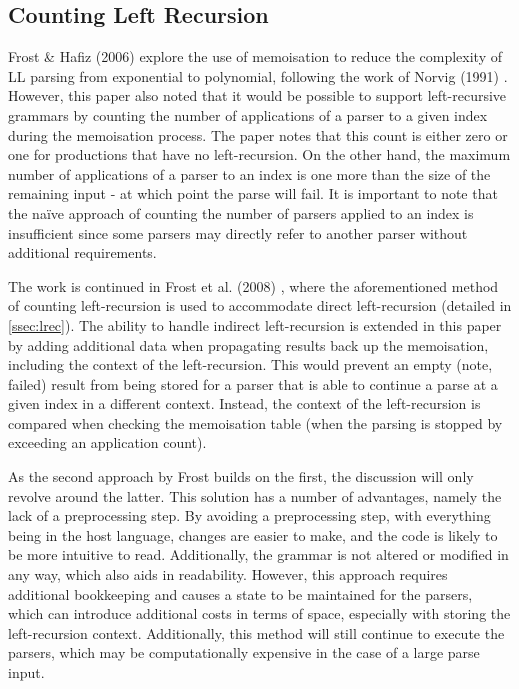 \subsection{Counting Left Recursion}
\label{ssec:lrcounts}

Frost \& Hafiz (2006) \cite{frost06} explore the use of memoisation to reduce the complexity of LL parsing from exponential to polynomial, following the work of Norvig (1991) \cite{norvig91}.
However, this paper also noted that it would be possible to support left-recursive grammars by counting the number of applications of a parser to a given index during the memoisation process.
The paper notes that this count is either zero or one for productions that have no left-recursion.
On the other hand, the maximum number of applications of a parser to an index is one more than the size of the remaining input - at which point the parse will fail.
It is important to note that the na\"ive approach of counting the number of parsers applied to an index is insufficient since some parsers may directly refer to another parser without additional requirements.

The work is continued in Frost et al. (2008) \cite{frost08}, where the aforementioned method of counting left-recursion is used to accommodate direct left-recursion (detailed in \autoref{ssec:lrec}).
The ability to handle indirect left-recursion is extended in this paper by adding additional data when propagating results back up the memoisation, including the context of the left-recursion.
This would prevent an empty (note, failed) result from being stored for a parser that is able to continue a parse at a given index in a different context.
Instead, the context of the left-recursion is compared when checking the memoisation table (when the parsing is stopped by exceeding an application count).

As the second approach by Frost builds on the first, the discussion will only revolve around the latter.
This solution has a number of advantages, namely the lack of a preprocessing step.
By avoiding a preprocessing step, with everything being in the host language, changes are easier to make, and the code is likely to be more intuitive to read.
Additionally, the grammar is not altered or modified in any way, which also aids in readability.
However, this approach requires additional bookkeeping and causes a state to be maintained for the parsers, which can introduce additional costs in terms of space, especially with storing the left-recursion context.
Additionally, this method will still continue to execute the parsers, which may be computationally expensive in the case of a large parse input.

